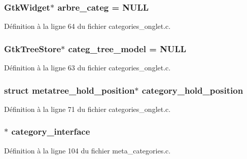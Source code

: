 \subsubsection[{arbre\_\-categ}]{\setlength{\rightskip}{0pt plus 5cm}GtkWidget$\ast$ {\bf arbre\_\-categ} = NULL}\label{categories__onglet_8c_a6cf88c38349ee099aa4138c213aae21b}


Définition à la ligne 64 du fichier categories\_\-onglet.c.

\subsubsection[{categ\_\-tree\_\-model}]{\setlength{\rightskip}{0pt plus 5cm}GtkTreeStore$\ast$ {\bf categ\_\-tree\_\-model} = NULL}\label{categories__onglet_8c_ae8424f0222ea0a41ea824d2294ee1b34}


Définition à la ligne 63 du fichier categories\_\-onglet.c.

\subsubsection[{category\_\-hold\_\-position}]{\setlength{\rightskip}{0pt plus 5cm}struct {\bf metatree\_\-hold\_\-position}$\ast$ {\bf category\_\-hold\_\-position}}\label{categories__onglet_8c_a7f1f945fd2d4ad6ccad85f0a7cc36f40}


Définition à la ligne 71 du fichier categories\_\-onglet.c.

\subsubsection[{category\_\-interface}]{$\ast$ {\bf category\_\-interface}}\label{categories__onglet_8c_ac3d52fdc414a19ac674a323f25194bc7}


Définition à la ligne 104 du fichier meta\_\-categories.c.


